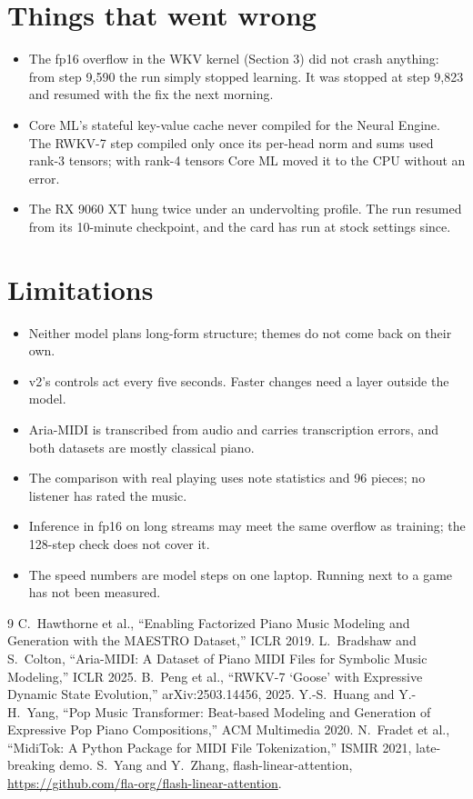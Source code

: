 \documentclass[11pt,a4paper]{article}
\begin{document}
\section{Things that went wrong}

\begin{itemize}
\item The fp16 overflow in the WKV kernel (Section 3) did not crash anything: from step 9,590 the run simply
stopped learning. It was stopped at step 9,823 and resumed with the fix the next morning.
\item Core ML's stateful key-value cache never compiled for the Neural Engine. The RWKV-7 step compiled only once
its per-head norm and sums used rank-3 tensors; with rank-4 tensors Core ML moved it to the CPU without an error.
\item The RX 9060 XT hung twice under an undervolting profile. The run resumed from its 10-minute checkpoint, and
the card has run at stock settings since.
\end{itemize}

\section{Limitations}

\begin{itemize}
\item Neither model plans long-form structure; themes do not come back on their own.
\item v2's controls act every five seconds. Faster changes need a layer outside the model.
\item Aria-MIDI is transcribed from audio and carries transcription errors, and both datasets are mostly classical
piano.
\item The comparison with real playing uses note statistics and 96 pieces; no listener has rated the music.
\item Inference in fp16 on long streams may meet the same overflow as training; the 128-step check does not cover
it.
\item The speed numbers are model steps on one laptop. Running next to a game has not been measured.
\end{itemize}

{\raggedright
\begin{thebibliography}{9}
 C.~Hawthorne et al., ``Enabling Factorized Piano Music Modeling and Generation with the MAESTRO
Dataset,'' ICLR 2019.
 L.~Bradshaw and S.~Colton, ``Aria-MIDI: A Dataset of Piano MIDI Files for Symbolic Music
Modeling,'' ICLR 2025.
 B.~Peng et al., ``RWKV-7 `Goose' with Expressive Dynamic State Evolution,'' arXiv:2503.14456, 2025.
 Y.-S.~Huang and Y.-H.~Yang, ``Pop Music Transformer: Beat-based Modeling and Generation of
Expressive Pop Piano Compositions,'' ACM Multimedia 2020.
 N.~Fradet et al., ``MidiTok: A Python Package for MIDI File Tokenization,'' ISMIR 2021, late-breaking demo.
 S.~Yang and Y.~Zhang, flash-linear-attention, \url{https://github.com/fla-org/flash-linear-attention}.
\end{thebibliography}
}
\end{document}
